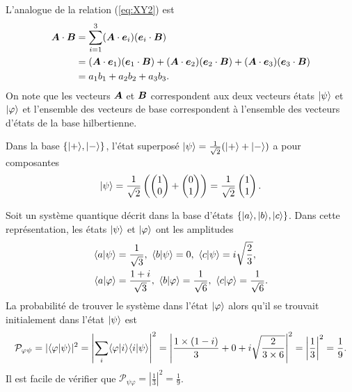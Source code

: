 L'analogue de la relation (\ref{eq:XY2}) est
\begin{equation}%
\begin{split}
\bls{A}\cdot\bls{B}  &  =\sum_{i=1}^{3}(\bls{A}\cdot\bls{e}_{i})
(\bls{e}_{i}\cdot\bls{B})\\
& =(\bls{A}\cdot\bls{e}_1)(\bls{e}_1\cdot\bls{B})
+(\bls{A}\cdot\bls{e}_2)(\bls{e}_2\cdot\bls{B})
+(\bls{A}\cdot\bls{e}_{3})(\bls{e}_{3}\cdot\bls{B})
\\
&  =a_1b_1+a_2b_2+a_{3}b_{3}.
\label{eq:AB2}%
\end{split}%
\end{equation}%
On note que les vecteurs $\boldsymbol{A}$ et $\boldsymbol{B}$ correspondent aux deux vecteurs
états $\vert\psi\rangle $ et $\vert\varphi\rangle $ et l'ensemble des vecteurs de base
correspondent à l'ensemble des vecteurs d'états de la base hilbertienne.

\begin{example}
Dans la base $\{\vert+\rangle,\vert-\rangle\}$, l'état superposé $\vert\psi\rangle
=\frac{1}{\sqrt{2}}(\vert+\rangle+\vert-\rangle)$ a pour composantes
\begin{equation}
\vert\psi\rangle =\frac{1}{\sqrt{2}}\left(\begin{pmatrix}
1\\
0
\end{pmatrix}+\begin{pmatrix}
0\\
1
\end{pmatrix}\right)=\frac{1}{\sqrt{2}}\begin{pmatrix}
1\\
1
\end{pmatrix}.
\end{equation}
\end{example}

\begin{example}
Soit un système quantique décrit dans la base d'états $\{\vert a\rangle,\vert b\rangle,\vert c\rangle
\}$. Dans cette représentation, les états $\vert\psi\rangle $ et $\vert\varphi\rangle$ ont
les amplitudes
\begin{subequations}%
\begin{align}
\langle a\vert\psi\rangle  &  =\frac{1}{\sqrt{3}},~\langle b\vert\psi\rangle =0,~\langle
c\vert\psi\rangle=i\sqrt{\frac{2}{3}},\\
\langle a\vert\varphi\rangle &  =\frac{1+i}{\sqrt{3}},~\langle b\vert\varphi\rangle
=\frac{1}{\sqrt{6}},~\langle c\vert\varphi\rangle=\frac{1}{\sqrt{6}}.
\end{align}
\end{subequations}%
La probabilité de trouver le système dans l'état $\vert\varphi\rangle$ alors qu'il se
trouvait initialement dans l'état $\vert\psi\rangle$ est
\begin{equation}%
\mathcal{P}_{\varphi\psi} =|\langle\varphi\ket{\psi}|^{2}=\left|
\sum_{i}\langle\varphi\ket{i}\langle i\ket{\psi}\right|^{2}=\left|
\frac{1\times(1-i)}{3}+0+i\sqrt{\frac{2}{3\times6}}\right|^{2}=\left|
\frac{1}{3}\right|^{2}=\frac{1}{9}.
\end{equation}%
Il est facile de vérifier que $\mathcal{P}_{\psi\varphi} =|\frac{1}{3}|^{2}
=\frac{1}{9}$.
\end{example}

